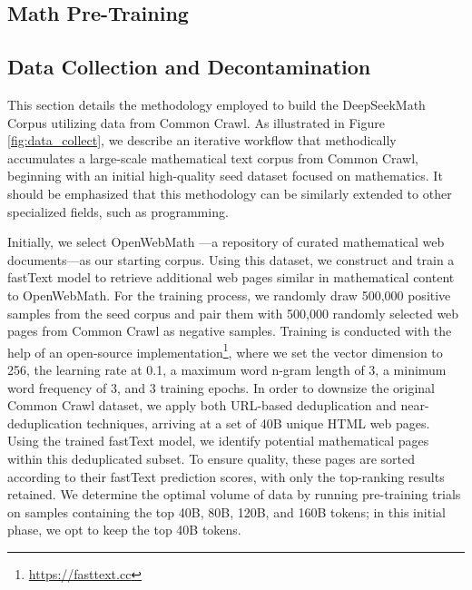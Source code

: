 \begin{itemize}[topsep=0pt]
\section{Math Pre-Training}

\subsection{Data Collection and Decontamination} This section details the methodology employed to build the DeepSeekMath Corpus utilizing data from Common Crawl. As illustrated in Figure \ref{fig:data_collect}, we describe an iterative workflow that methodically accumulates a large-scale mathematical text corpus from Common Crawl, beginning with an initial high-quality seed dataset focused on mathematics. It should be emphasized that this methodology can be similarly extended to other specialized fields, such as programming.

Initially, we select OpenWebMath \citep{openwebmath}—a repository of curated mathematical web documents—as our starting corpus. Using this dataset, we construct and train a fastText model \citep{joulin2016fasttext} to retrieve additional web pages similar in mathematical content to OpenWebMath. For the training process, we randomly draw 500,000 positive samples from the seed corpus and pair them with 500,000 randomly selected web pages from Common Crawl as negative samples. Training is conducted with the help of an open-source implementation\footnote{\url{https://fasttext.cc}}, where we set the vector dimension to 256, the learning rate at 0.1, a maximum word n-gram length of 3, a minimum word frequency of 3, and 3 training epochs. In order to downsize the original Common Crawl dataset, we apply both URL-based deduplication and near-deduplication techniques, arriving at a set of 40B unique HTML web pages. Using the trained fastText model, we identify potential mathematical pages within this deduplicated subset. To ensure quality, these pages are sorted according to their fastText prediction scores, with only the top-ranking results retained. We determine the optimal volume of data by running pre-training trials on samples containing the top 40B, 80B, 120B, and 160B tokens; in this initial phase, we opt to keep the top 40B tokens.


\end{itemize}
